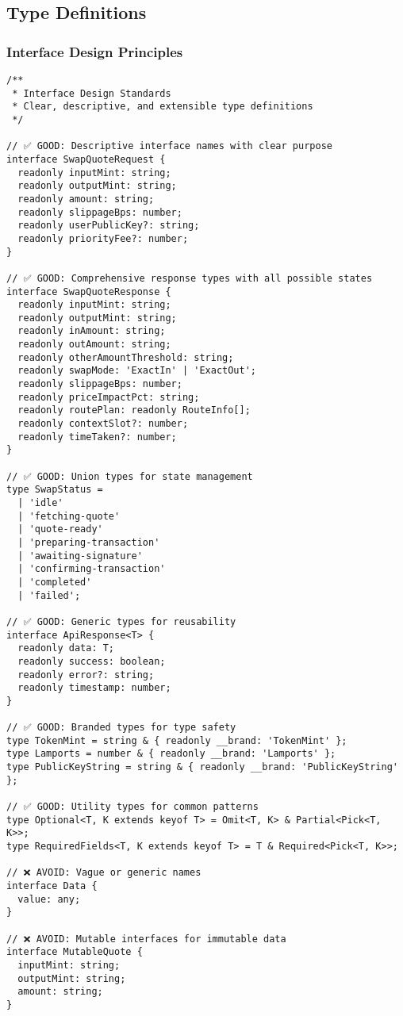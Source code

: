 \documentclass[11pt,a4paper]{article}
\begin{document}
\subsection{Type Definitions}

\subsubsection{Interface Design Principles}

\begin{lstlisting}[style=typescript, caption=Interface Design Standards]
/**
 * Interface Design Standards
 * Clear, descriptive, and extensible type definitions
 */

// ✅ GOOD: Descriptive interface names with clear purpose
interface SwapQuoteRequest {
  readonly inputMint: string;
  readonly outputMint: string;
  readonly amount: string;
  readonly slippageBps: number;
  readonly userPublicKey?: string;
  readonly priorityFee?: number;
}

// ✅ GOOD: Comprehensive response types with all possible states
interface SwapQuoteResponse {
  readonly inputMint: string;
  readonly outputMint: string;
  readonly inAmount: string;
  readonly outAmount: string;
  readonly otherAmountThreshold: string;
  readonly swapMode: 'ExactIn' | 'ExactOut';
  readonly slippageBps: number;
  readonly priceImpactPct: string;
  readonly routePlan: readonly RouteInfo[];
  readonly contextSlot?: number;
  readonly timeTaken?: number;
}

// ✅ GOOD: Union types for state management
type SwapStatus = 
  | 'idle'
  | 'fetching-quote'
  | 'quote-ready'
  | 'preparing-transaction'
  | 'awaiting-signature'
  | 'confirming-transaction'
  | 'completed'
  | 'failed';

// ✅ GOOD: Generic types for reusability
interface ApiResponse<T> {
  readonly data: T;
  readonly success: boolean;
  readonly error?: string;
  readonly timestamp: number;
}

// ✅ GOOD: Branded types for type safety
type TokenMint = string & { readonly __brand: 'TokenMint' };
type Lamports = number & { readonly __brand: 'Lamports' };
type PublicKeyString = string & { readonly __brand: 'PublicKeyString' };

// ✅ GOOD: Utility types for common patterns
type Optional<T, K extends keyof T> = Omit<T, K> & Partial<Pick<T, K>>;
type RequiredFields<T, K extends keyof T> = T & Required<Pick<T, K>>;

// ❌ AVOID: Vague or generic names
interface Data {
  value: any;
}

// ❌ AVOID: Mutable interfaces for immutable data
interface MutableQuote {
  inputMint: string;
  outputMint: string;
  amount: string;
}
\end{lstlisting}
\end{document}
